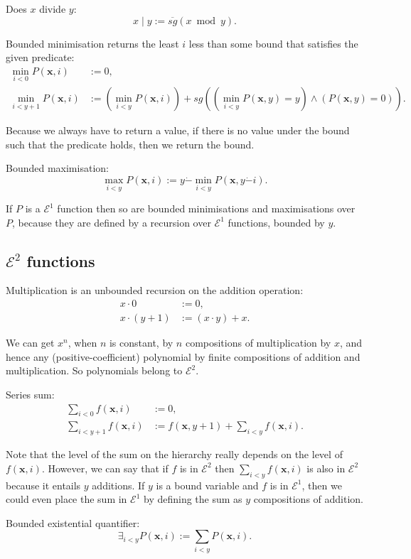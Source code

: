 \documentclass[a4paper]{article}
\newcommand{\grz}[1]{$\mathcal{E}^{#1}$}	%
\newcommand{\xvec}{\mathbf{x}}	%
\newcommand{\psub}{\dot -}	%
\newcommand{\rsg}{\overline{sg}} %
\newcommand{\recur}[1]{\begin{equation} \begin{split} #1 \end{split} \end{equation}}	%
\theoremstyle{plain}
\theoremstyle{definition}
\begin{document}
Does $x$ divide $y$:
\begin{equation} x \mid y := \rsg( x \bmod{y} ). \end{equation}

Bounded minimisation returns the least $i$ less than some bound that satisfies the given predicate:
\recur{
	\min_{i < 0} P(\xvec,i) &:= 0,	\\
	\min_{i < y+1} P(\xvec,i) &:= \left( \min_{i  < y} P(\xvec,i) \right) + sg\left( (\min_{i<y}P(\xvec,y)=y) \wedge (P(\xvec,y) = 0) \right).
}

Because we always have to return a value, if there is no value under the bound such that the predicate holds, then we return the bound.

Bounded maximisation:
\begin{equation} \max_{i < y} P(\xvec,i) := y \psub \min_{i < y} P(\xvec, y \psub i). \end{equation}

If $P$ is a \grz{1} function then so are bounded minimisations and maximisations over $P$, because they are defined by a recursion over \grz{1} functions, bounded by $y$.

\subsection{\grz{2} functions}
Multiplication is an unbounded recursion on the addition operation:
\recur{
	x \cdot 0 &:= 0,				\\
	x \cdot (y+1) &:= (x \cdot y) + x.
}

We can get $x^n$, when $n$ is constant, by $n$ compositions of multiplication by $x$, and hence any (positive-coefficient) polynomial by finite compositions of addition and multiplication. So polynomials belong to \grz{2}.

Series sum:
\recur{
	\sum_{i < 0} f(\xvec, i) &:= 0,		\\
	\sum_{i < y+1} f(\xvec,i) &:= f(\xvec,y+1) + \sum_{i < y} f(\xvec,i).
}

Note that the level of the sum on the hierarchy really depends on the level of $f(\xvec,i)$. However, we can say that if $f$ is in \grz{2} then $\sum_{i < y} f(\xvec,i)$ is also in \grz{2} because it entails $y$ additions. If $y$ is a bound variable and $f$ is in \grz{1}, then we could even place the sum in \grz{1} by defining the sum as $y$ compositions of addition.

Bounded existential quantifier:
\begin{equation} \exists_{i < y} P(\xvec,i) := \sum_{i < y} P(\xvec,i). \end{equation}
\end{document}
